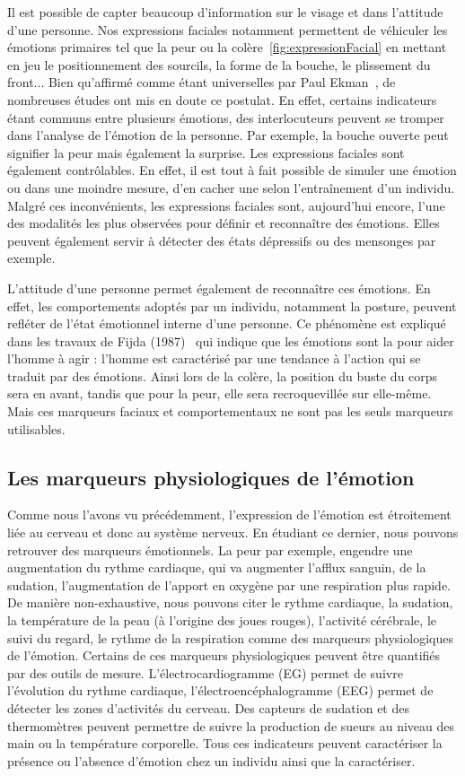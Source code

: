 
Il est possible de capter beaucoup d'information sur le visage et dans l'attitude d'une personne. Nos expressions faciales notamment permettent de véhiculer les émotions primaires tel que la peur ou la colère~\ref{fig:expressionFacial} en mettant en jeu le positionnement des sourcils, la forme de la bouche, le plissement du front... Bien qu'affirmé comme étant universelles par Paul Ekman~\cite{Ekman1978}, de nombreuses études ont mis en doute ce postulat. En effet, certains indicateurs étant communs entre plusieurs émotions, des interlocuteurs peuvent se tromper dans l'analyse de l'émotion de la personne. Par exemple, la bouche ouverte peut signifier la peur mais également la surprise. Les expressions faciales sont également contrôlables. En effet, il est tout à fait possible de simuler une émotion ou dans une moindre mesure, d'en cacher une selon l’entraînement d'un individu.
Malgré ces inconvénients, les expressions faciales sont, aujourd'hui encore, l'une des modalités les plus observées pour définir et reconnaître des émotions. Elles peuvent également servir à détecter des états dépressifs ou des mensonges par exemple.

L'attitude d'une personne permet également de reconnaître ces émotions. En effet, les comportements adoptés par un individu, notamment la posture, peuvent refléter de l'état émotionnel interne d'une personne. Ce phénomène est expliqué dans les travaux de Fijda (1987)~\cite{Fijda1987} qui indique que les émotions sont la pour aider l'homme à agir : l'homme est caractérisé par une tendance à l'action qui se traduit par des émotions. Ainsi lors de la colère, la position du buste du corps sera en avant, tandis que pour la peur, elle sera recroquevillée sur elle-même. Mais ces marqueurs faciaux et comportementaux ne sont pas les seuls marqueurs utilisables.

\subsection{Les marqueurs physiologiques de l'émotion}
Comme nous l'avons vu précédemment, l'expression de l'émotion est étroitement liée au cerveau et donc au système nerveux. En étudiant ce dernier, nous pouvons retrouver des marqueurs émotionnels. La peur par exemple, engendre une augmentation du rythme cardiaque, qui va augmenter l'afflux sanguin, de la sudation, l'augmentation de l'apport en oxygène par une respiration plus rapide. De manière non-exhaustive, nous pouvons citer le rythme cardiaque, la sudation, la température de la peau (à l'origine des joues rouges), l'activité cérébrale, le suivi du regard, le rythme de la respiration comme des marqueurs physiologiques de l'émotion. Certains de ces marqueurs physiologiques peuvent être quantifiés par des outils de mesure. L'électrocardiogramme (EG) permet de suivre l'évolution du rythme cardiaque, l'électroencéphalogramme (EEG) permet de détecter les zones d'activités du cerveau. Des capteurs de sudation et des thermomètres peuvent permettre de suivre la production de sueurs au niveau des main ou la température corporelle. Tous ces indicateurs peuvent caractériser la présence ou l'absence d'émotion chez un individu ainsi que la caractériser.
